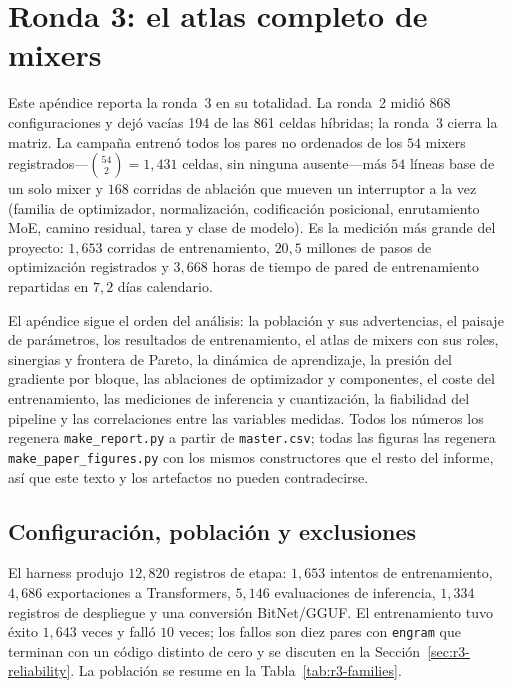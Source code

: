 
\section{Ronda 3: el atlas completo de mixers}
\label{sec:annex-experiment-3}

Este apéndice reporta la ronda~3 en su totalidad. La ronda~2 midió 868 configuraciones y dejó vacías 194 de las 861 celdas híbridas; la ronda~3 cierra la matriz. La campaña entrenó todos los pares no ordenados de los $54$ mixers registrados---$\binom{54}{2}=1{,}431$ celdas, sin ninguna ausente---más $54$ líneas base de un solo mixer y $168$ corridas de ablación que mueven un interruptor a la vez (familia de optimizador, normalización, codificación posicional, enrutamiento MoE, camino residual, tarea y clase de modelo). Es la medición más grande del proyecto: $1{,}653$ corridas de entrenamiento, $20,5$ millones de pasos de optimización registrados y $3{,}668$ horas de tiempo de pared de entrenamiento repartidas en $7,2$ días calendario.

El apéndice sigue el orden del análisis: la población y sus advertencias, el paisaje de parámetros, los resultados de entrenamiento, el atlas de mixers con sus roles, sinergias y frontera de Pareto, la dinámica de aprendizaje, la presión del gradiente por bloque, las ablaciones de optimizador y componentes, el coste del entrenamiento, las mediciones de inferencia y cuantización, la fiabilidad del pipeline y las correlaciones entre las variables medidas. Todos los números los regenera \texttt{make\_report.py} a partir de \texttt{master.csv}; todas las figuras las regenera \texttt{make\_paper\_figures.py} con los mismos constructores que el resto del informe, así que este texto y los artefactos no pueden contradecirse.

\subsection{Configuración, población y exclusiones}

El harness produjo $12{,}820$ registros de etapa: $1{,}653$ intentos de entrenamiento, $4{,}686$ exportaciones a Transformers, $5{,}146$ evaluaciones de inferencia, $1{,}334$ registros de despliegue y una conversión BitNet/GGUF. El entrenamiento tuvo éxito $1{,}643$ veces y falló $10$ veces; los fallos son diez pares con \texttt{engram} que terminan con un código distinto de cero y se discuten en la Sección~\ref{sec:r3-reliability}. La población se resume en la Tabla~\ref{tab:r3-families}.

